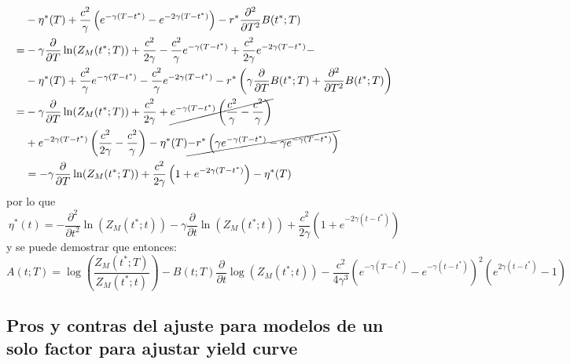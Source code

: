 \begin{align*}
    &- \eta^*(T) + \frac{c^2}{\gamma} \left( e^{-\gamma(T-t^*)} - e^{-2\gamma(T-t^*)} \right)  - r^* \frac{\partial^2}{\partial T^2} B(t^*; T) \\
    =& -\gamma\frac{\partial}{\partial T}\ln(Z_M(t^*; T)) + \frac{c^2}{2\gamma} - \frac{c^2}{\gamma} e^{-\gamma(T-t^*)} + \frac{c^2}{2\gamma} e^{-2\gamma(T-t^*)} - \\
    &- \eta^*(T) + \frac{c^2}{\gamma}e^{-\gamma(T-t^*)} - \frac{c^2}{\gamma}e^{-2\gamma(T-t^*)} - r^*\left( \gamma \frac{\partial}{\partial T} B(t^*; T) + \frac{\partial^2}{\partial T^2} B(t^*; T) \right) \\
    =& -\gamma\frac{\partial}{\partial T}\ln(Z_M(t^*; T)) + \frac{c^2}{2\gamma} + \cancel{e^{-\gamma(T-t^*)}\left( \frac{c^2}{\gamma} - \frac{c^2}{\gamma} \right)} \\
    &+ e^{-2\gamma(T-t^*)} \left( \frac{c^2}{2\gamma} - \frac{c^2}{\gamma} \right) - \eta^*(T) \cancel{- r^*\left( \gamma e^{-\gamma(T-t^*)} - \gamma e^{-\gamma(T-t^*)} \right)} \\
    &= -\gamma\frac{\partial}{\partial T}\ln(Z_M(t^*; T)) + \frac{c^2}{2\gamma} \left( 1 + e^{-2\gamma(T-t^*)} \right) - \eta^*(T) \\
\end{align*}
por lo que
\begin{equation*}
    \boxed{\eta^*(t) = -\frac{\partial^2}{\partial t^2}\ln(Z_M(t^*; t)) -\gamma\frac{\partial}{\partial t}\ln(Z_M(t^*; t)) + \frac{c^2}{2\gamma} \left( 1 + e^{-2\gamma(t-t^*)} \right)}
\end{equation*}
y se puede demostrar que entonces:
\begin{equation*}
    \boxed{A(t; T) = \log\left(\frac{Z_M(t^*; T)}{Z_M(t^*; t)}\right) 
    - B(t; T) \frac{\partial}{\partial t} \log(Z_M(t^*; t)) - \frac{c^2}{4\gamma^3} \left( e^{-\gamma(T-t^*)} - e^{-\gamma(t-t^*)} \right)^2 \left( e^{2\gamma(t-t^*)} - 1 \right)}
\end{equation*}



\subsection{Pros y contras del ajuste para modelos de un solo factor para ajustar yield curve}

